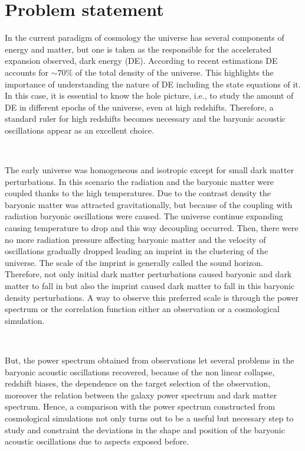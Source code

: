 \section{Problem statement }


In the current paradigm of cosmology the universe 
has several components of energy and matter, but one is taken as the responsible for the accelerated expansion
observed,  dark energy (DE). 
According to recent estimations DE accounts  for $\sim 70 \%$ of the total density of the universe. This highlights the importance
of understanding the nature of DE including the state equations of it.  In this case, it is essential to know the hole picture, i.e., 
to study the amount of DE in different epochs of the universe, even at high redshifts. Therefore, a standard ruler for high redshifts 
becomes necessary and the baryonic acoustic oscillations appear as an excellent choice. 

\

The early universe was homogeneous and isotropic except for small dark matter perturbations. In this scenario
the radiation and the baryonic matter were coupled thanks to the high temperatures. Due to the contrast density 
the baryonic matter was attracted gravitationally,  but because of the coupling with radiation baryonic oscillations 
were caused. The universe continue expanding causing temperature to drop and this way decoupling occurred. 
Then, there were no more radiation pressure affecting baryonic matter and the velocity of oscillations gradually dropped 
leading an imprint in the clustering of the universe. The scale of the imprint is generally called the sound horizon. 
Therefore, not only initial dark matter perturbations caused baryonic 
and dark matter to fall in but also the imprint caused dark matter to fall in this baryonic density perturbations. 
A way to observe this preferred scale is through the power spectrum or the correlation function either an observation 
or a cosmological simulation. 

\ 

But, the power spectrum obtained from observations let several problems in the baryonic acoustic oscillations
recovered, because of the non linear collapse, redshift biases, the dependence on the target selection of the observation, 
moreover the relation between the galaxy power spectrum and dark matter spectrum. Hence, a comparison 
with the power spectrum constructed from cosmological simulations not only turns out to be a useful but 
necessary step to study and constraint the deviations in the shape and position of the baryonic acoustic 
oscillations due to aspects exposed before. 

